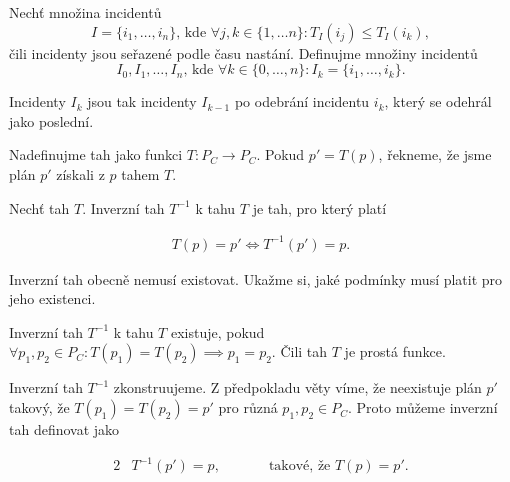 \begin{definice}\label{df:INC}
  Nechť množina incidentů 
  \begin{equation*}
    I = \{ i_1, \dots , i_n \} \text{, kde } \forall j, k \in \{ 1, \dots n\} \colon T_I(i_j) \leq T_I(i_k),
  \end{equation*}
  čili incidenty jsou seřazené podle času nastání.
  Definujme množiny incidentů
  \begin{equation*}
    I_0, I_1, \dots, I_n \text{, kde } \forall k \in \{ 0, \dots, n \} \colon I_k = \{ i_1, \dots, i_k \}.
  \end{equation*}

  Incidenty $I_k$ jsou tak incidenty $I_{k-1}$ po odebrání incidentu $i_k$, který se odehrál jako poslední.
\end{definice}

\begin{definice}[Tah]\label{df:tah}
  Nadefinujme tah jako funkci $T \colon P_C \rightarrow P_C$.
  Pokud $p' = T(p)$, řekneme, že jsme plán $p'$ získali z $p$ tahem $T$.
\end{definice}

\begin{definice}\label{df:tah}
  Nechť tah $T$. Inverzní tah $T^{-1}$ k tahu $T$ je tah, pro který platí

  \begin{align*}
    T(p) = p' \Leftrightarrow T^{-1}(p') = p.
  \end{align*}
\end{definice}

Inverzní tah obecně nemusí existovat. Ukažme si, jaké podmínky musí platit pro jeho existenci.

\begin{veta}\label{veta:inverzNutnost}
  Inverzní tah $T^{-1}$ k tahu $T$ existuje, pokud $\forall p_1, p_2 \in P_C \colon T(p_1) = T(p_2) \implies p_1 = p_2$.
  Čili tah $T$ je prostá funkce.

\end{veta}
\begin{dukaz}
  Inverzní tah $T^{-1}$ zkonstruujeme.
  Z předpokladu věty víme, že neexistuje plán $p'$ takový, že $T(p_1) = T(p_2) = p'$ pro různá $p_1, p_2 \in P_C$. 
  Proto můžeme inverzní tah definovat jako

  \begin{alignat*}{2}
    & T^{-1}(p') = p, \quad && \hspace{10pt} \text{takové, že $T(p) = p'$}.
  \end{alignat*}
\end{dukaz}

